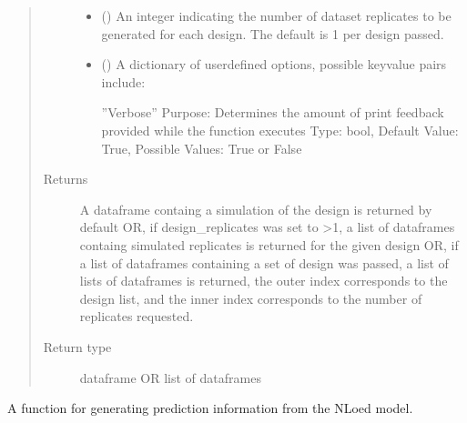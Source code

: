\documentclass[letterpaper,10pt,english,openany,oneside]{sphinxmanual}
\begin{document}
\begin{fulllineitems}
\begin{fulllineitems}
\begin{quote}
\begin{description}
\begin{itemize}
\item {} 
 (\sphinxstyleliteralemphasis{\sphinxupquote{, }}) \textendash{} An integer indicating the number of dataset
replicates to be generated for each design. The default is 1 per design passed.

\item {} 
 (\sphinxstyleliteralemphasis{\sphinxupquote{, }}) \textendash{} 
A dictionary of user\sphinxhyphen{}defined options, possible key\sphinxhyphen{}value pairs
include:

”Verbose” \textendash{}
Purpose: Determines the amount of print feedback provided while the function executes
Type: bool,
Default Value: True,
Possible Values: True or False


\end{itemize}

\item[{Returns}] \leavevmode
A dataframe containg a simulation of the design is returned by default
OR, if design\_replicates was set to \textgreater{}1, a list of dataframes containg simulated
replicates is returned for the given design
OR,  if a list of dataframes containing a set of design was passed,
a list of lists of dataframes is returned, the outer index corresponds to the design
list, and the inner index corresponds to the number of replicates requested.

\item[{Return type}] \leavevmode
dataframe OR list of dataframes

\end{description}\end{quote}

\end{fulllineitems}


\begin{fulllineitems}
\label{\detokenize{nloed:nloed.model.Model.predict}}
A function for generating prediction information from the NLoed model.


\end{fulllineitems}
\end{fulllineitems}
\end{document}
